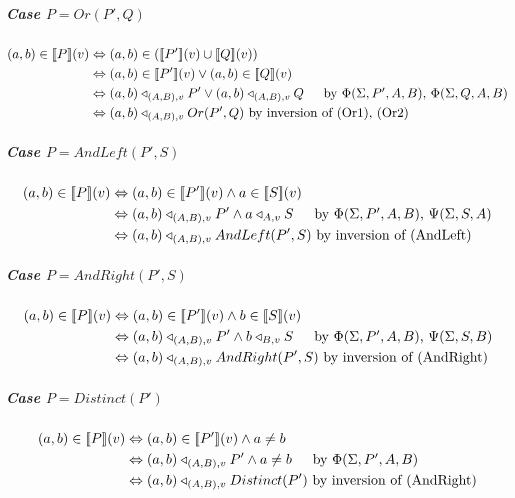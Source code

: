 \documentclass[12pt,a4paper,twoside,openright]{report}
\newcommand{\db}[1]{{\bf [\![}#1{\bf ]\!]}}
\newcommand{\deno}[1]{\db{#1}(v)}
\newcommand{\denoRule}[2]{#1 \in \deno{#2}}
\newcommand{\opRule}[3]{#1 \triangleleft_{#2, v} #3}
\newcommand{\phiRule}[3]{\Phi(\Sigma, #1, #2, #3)}
\newcommand{\psiRule}[2]{\Psi(\Sigma, #1, #2)}
\let\oldsubparagraph\subparagraph
\renewcommand{\subparagraph}[1]{\oldsubparagraph{#1}\mbox{}}
\begin{document}
\subparagraph{Case $P = Or(P', Q)$}
\begin{equation} \label{case Or(P', Q)}
\begin{split}
\denoRule{(a, b)}{P} & \Leftrightarrow (a, b) \in (\deno{P'} \cup \deno{Q})\\
					& \Leftrightarrow \denoRule{(a, b)}{P'} \vee \denoRule{(a, b)}{Q}\\
					&\Leftrightarrow \opRule{(a,b)}{(A, B)}{P'} \vee \opRule{(a,b)}{(A, B)}{Q}\indent\mbox{by $\phiRule{P'}{A}{B}$, $\phiRule{Q}{A}{B}$} \\
					& \Leftrightarrow \opRule{(a, b)}{(A, B)}{Or(P', Q)} \mbox{ by inversion of (Or1), (Or2)}\\\end{split}
\end{equation}

\subparagraph{Case $P = AndLeft(P', S)$}
\begin{equation} \label{case AndLeft(P', Q)}
\begin{split}
\denoRule{(a, b)}{P} & \Leftrightarrow \denoRule{(a, b)}{P'} \wedge \denoRule{a}{S}\\
					&\Leftrightarrow \opRule{(a,b)}{(A, B)}{P'} \wedge \opRule{a}{A}{S}\indent\mbox{by $\phiRule{P'}{A}{B}$, $\psiRule{S}{A}$} \\
					& \Leftrightarrow \opRule{(a, b)}{(A, B)}{AndLeft(P', S)} \mbox{ by inversion of (AndLeft)}\\\end{split}
\end{equation}

\subparagraph{Case $P = AndRight(P', S)$}
\begin{equation} \label{case AndRight(P', Q)}
\begin{split}
\denoRule{(a, b)}{P} & \Leftrightarrow \denoRule{(a, b)}{P'} \wedge \denoRule{b}{S}\\
					&\Leftrightarrow \opRule{(a,b)}{(A, B)}{P'} \wedge \opRule{b}{B}{S}\indent\mbox{by $\phiRule{P'}{A}{B}$, $\psiRule{S}{B}$} \\
					& \Leftrightarrow \opRule{(a, b)}{(A, B)}{AndRight(P', S)} \mbox{ by inversion of (AndRight)}\\\end{split}
\end{equation}

\subparagraph{Case $P = Distinct(P')$}
\begin{equation} \label{case Distinct(P)}
\begin{split}
\denoRule{(a, b)}{P} & \Leftrightarrow \denoRule{(a, b)}{P'} \wedge a \neq b \\
					&\Leftrightarrow \opRule{(a,b)}{(A, B)}{P'} \wedge a \neq b\indent\mbox{by $\phiRule{P'}{A}{B}$} \\
					& \Leftrightarrow \opRule{(a, b)}{(A, B)}{Distinct(P')} \mbox{ by inversion of (AndRight)}\\\end{split}
\end{equation}
\end{document}
